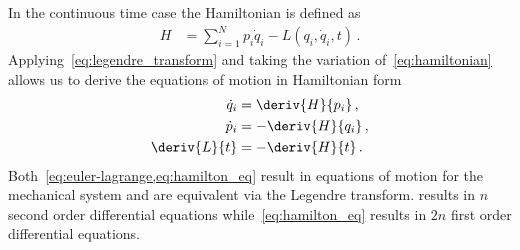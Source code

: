 In the continuous time case the Hamiltonian is defined as
\begin{align}\label{eq:hamiltonian}
	H &= \sum_{i = 1}^N p_i \dot{q}_i - L \left( q_i,\dot{q}_i, t \right) \, .
\end{align}
Applying~\cref{eq:legendre_transform} and taking the variation of~\cref{eq:hamiltonian} allows us to derive the equations of motion in Hamiltonian form
\begin{subequations}\label{eq:hamilton_eq}
\begin{align}
	\dot{q}_i &= \deriv{H}{p_i} \, ,\\
	\dot{p}_i &= - \deriv{H}{q_i} \, , \\
	\deriv{L}{t} &= -\deriv{H}{t} \, .
\end{align}
\end{subequations}
Both~\cref{eq:euler-lagrange,eq:hamilton_eq} result in equations of motion for the mechanical system and are equivalent via the Legendre transform.
 results in \( n \) second order differential equations while~\cref{eq:hamilton_eq} results in \( 2n \) first order differential equations.
